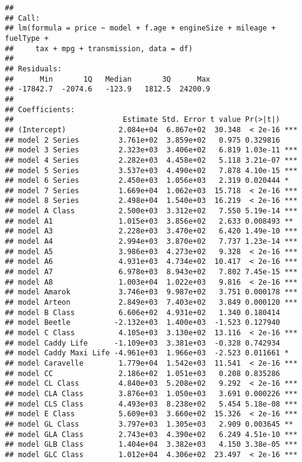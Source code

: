 \documentclass[
]{article}
\begin{document}
\begin{verbatim}
## 
## Call:
## lm(formula = price ~ model + f.age + engineSize + mileage + fuelType + 
##     tax + mpg + transmission, data = df)
## 
## Residuals:
##      Min       1Q   Median       3Q      Max 
## -17842.7  -2074.6   -123.9   1812.5  24200.9 
## 
## Coefficients:
##                         Estimate Std. Error t value Pr(>|t|)    
## (Intercept)            2.084e+04  6.867e+02  30.348  < 2e-16 ***
## model 2 Series         3.761e+02  3.859e+02   0.975 0.329816    
## model 3 Series         2.323e+03  3.406e+02   6.819 1.03e-11 ***
## model 4 Series         2.282e+03  4.458e+02   5.118 3.21e-07 ***
## model 5 Series         3.537e+03  4.490e+02   7.878 4.10e-15 ***
## model 6 Series         2.450e+03  1.056e+03   2.319 0.020444 *  
## model 7 Series         1.669e+04  1.062e+03  15.718  < 2e-16 ***
## model 8 Series         2.498e+04  1.540e+03  16.219  < 2e-16 ***
## model A Class          2.500e+03  3.312e+02   7.550 5.19e-14 ***
## model A1               1.015e+03  3.856e+02   2.633 0.008493 ** 
## model A3               2.228e+03  3.470e+02   6.420 1.49e-10 ***
## model A4               2.994e+03  3.870e+02   7.737 1.23e-14 ***
## model A5               3.986e+03  4.273e+02   9.328  < 2e-16 ***
## model A6               4.931e+03  4.734e+02  10.417  < 2e-16 ***
## model A7               6.978e+03  8.943e+02   7.802 7.45e-15 ***
## model A8               1.003e+04  1.022e+03   9.816  < 2e-16 ***
## model Amarok           3.746e+03  9.987e+02   3.751 0.000178 ***
## model Arteon           2.849e+03  7.403e+02   3.849 0.000120 ***
## model B Class          6.606e+02  4.931e+02   1.340 0.180414    
## model Beetle          -2.132e+03  1.400e+03  -1.523 0.127940    
## model C Class          4.105e+03  3.130e+02  13.116  < 2e-16 ***
## model Caddy Life      -1.109e+03  3.381e+03  -0.328 0.742934    
## model Caddy Maxi Life -4.961e+03  1.966e+03  -2.523 0.011661 *  
## model Caravelle        1.779e+04  1.542e+03  11.541  < 2e-16 ***
## model CC               2.186e+02  1.051e+03   0.208 0.835286    
## model CL Class         4.840e+03  5.208e+02   9.292  < 2e-16 ***
## model CLA Class        3.876e+03  1.050e+03   3.691 0.000226 ***
## model CLS Class        4.493e+03  8.238e+02   5.454 5.18e-08 ***
## model E Class          5.609e+03  3.660e+02  15.326  < 2e-16 ***
## model GL Class         3.797e+03  1.305e+03   2.909 0.003645 ** 
## model GLA Class        2.743e+03  4.390e+02   6.249 4.51e-10 ***
## model GLB Class        1.404e+04  3.382e+03   4.150 3.38e-05 ***
## model GLC Class        1.012e+04  4.306e+02  23.497  < 2e-16 ***

\end{verbatim}
\end{document}
